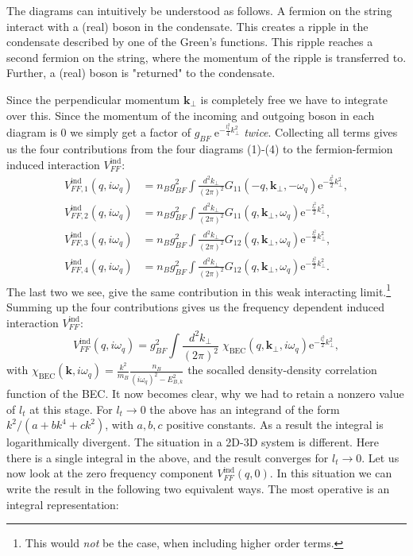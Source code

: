 The diagrams can intuitively be understood as follows. A fermion on the string interact with a (real) boson in the condensate. This creates a ripple in the condensate described by one of the Green's functions. This ripple reaches a second fermion on the string, where the momentum of the ripple is transferred to. Further, a (real) boson is "returned" to the condensate. 

Since the perpendicular momentum $\mathbf{k}_\perp$ is completely free we have to integrate over this. Since the momentum of the incoming and outgoing boson in each diagram is 0 we simply get a factor of $g_{BF}\; \text{e}^{-\frac{l_t^2}{4}k_\perp^2}$ \textit{twice}. Collecting all terms gives us the four contributions from the four diagrams (1)-(4) to the fermion-fermion induced interaction $V_{FF}^\text{ind}$: 
\begin{align}
V_{FF,1}^\text{ind}(q,i\omega_q) &= n_Bg_{BF}^2\int\frac{d^2k_\perp}{(2\pi)^2}G_{11}(-q,\mathbf{k}_\perp,-\omega_q)\text{e}^{-\frac{l_t^2}{2}k_\perp^2}, \nonumber \\
V_{FF,2}^\text{ind}(q,i\omega_q) &= n_Bg_{BF}^2\int\frac{d^2k_\perp}{(2\pi)^2}G_{11}(q,\mathbf{k}_\perp,\omega_q)\text{e}^{-\frac{l_t^2}{2}k_\perp^2}, \nonumber \\
V_{FF,3}^\text{ind}(q,i\omega_q) &= n_Bg_{BF}^2\int\frac{d^2k_\perp}{(2\pi)^2}G_{12}(q,\mathbf{k}_\perp,\omega_q)\text{e}^{-\frac{l_t^2}{2}k_\perp^2}, \nonumber \\
V_{FF,4}^\text{ind}(q,i\omega_q) &= n_Bg_{BF}^2\int\frac{d^2k_\perp}{(2\pi)^2}G_{12}(q,\mathbf{k}_\perp,\omega_q)\text{e}^{-\frac{l_t^2}{2}k_\perp^2}. 
\end{align}
The last two we see, give the same contribution in this weak interacting limit.\footnote{This would \textit{not} be the case, when including higher order terms.} Summing up the four contributions gives us the frequency dependent induced interaction $V_{FF}^\text{ind}$:
\begin{equation}
V_{FF}^\text{ind}(q,i\omega_q) = g_{BF}^2\int\frac{d^2k_\perp}{(2\pi)^2}\; \chi_\text{BEC}(q,\mathbf{k}_\perp,i\omega_q)\text{e}^{-\frac{l_t^2}{2}k_\perp^2}, 
\label{eq.VFFindXBEC}
\end{equation}
with $\chi_\text{BEC}(\mathbf{k},i\omega_q) = \frac{k^2}{m_B}\frac{n_B}{(i\omega_q)^2-E_{B,k}^2}$ the socalled density-density correlation function of the BEC. It now becomes clear, why we had to retain a nonzero value of $l_t$ at this stage. For $l_t\to 0$ the above has an integrand of the form $k^2/(a+bk^4+ck^2)$, with $a,b,c$ positive constants. As a result the integral is logarithmically divergent. The situation in a 2D-3D system is different. Here there is a single integral in the above, and the result converges for $l_t\to 0$. Let us now look at the zero frequency component $V_{FF}^\text{ind}(q,0)$. In this situation we can write the result in the following two equivalent ways. The most operative is an integral representation:
